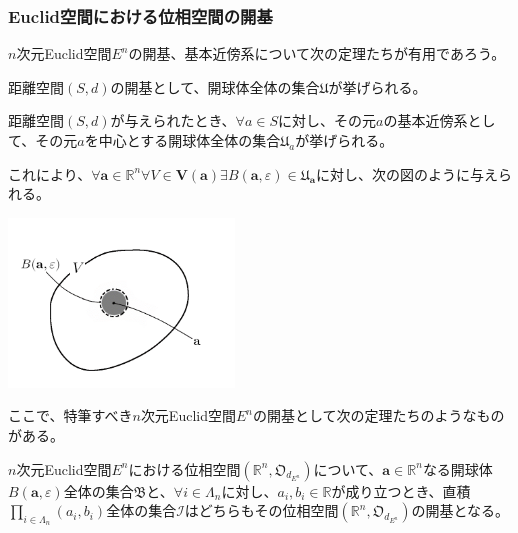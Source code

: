 \documentclass[dvipdfmx]{jsarticle}
\begin{document}
\subsubsection{Euclid空間における位相空間の開基}%
$n$次元Euclid空間$E^{n}$の開基、基本近傍系について次の定理たちが有用であろう。
\begin{thm*}
距離空間$(S,d)$の開基として、開球体全体の集合$\mathfrak{U}$が挙げられる。
\end{thm*}
\begin{thm*}
距離空間$(S,d)$が与えられたとき、$\forall a \in S$に対し、その元$a$の基本近傍系として、その元$a$を中心とする開球体全体の集合$\mathfrak{U}_{a}$が挙げられる。
\end{thm*}\par
これにより、$\forall\mathbf{a} \in \mathbb{R}^{n}\forall V \in \mathbf{V}\left( \mathbf{a} \right)\exists B\left( \mathbf{a},\varepsilon \right) \in \mathfrak{U}_{\mathbf{a}}$に対し、次の図のように与えられる。
\begin{center}
\includegraphics[width=60mm]{8.2.2.a.png}
\end{center}\par
ここで、特筆すべき$n$次元Euclid空間$E^{n}$の開基として次の定理たちのようなものがある。
\begin{thm}\label{8.2.2.3}
$n$次元Euclid空間$E^{n}$における位相空間$\left( \mathbb{R}^{n},\mathfrak{O}_{d_{E^{n}}} \right)$について、$\mathbf{a} \in \mathbb{R}^{n}$なる開球体$B\left( \mathbf{a},\varepsilon \right)$全体の集合$\mathfrak{B}$と、$\forall i \in \varLambda_{n}$に対し、$a_{i},b_{i} \in \mathbb{R}$が成り立つとき、直積$\prod_{i \in \varLambda_{n}} \left( a_{i},b_{i} \right)$全体の集合$\mathcal{I}$はどちらもその位相空間$\left( \mathbb{R}^{n},\mathfrak{O}_{d_{E^{n}}} \right)$の開基となる。
\end{thm}
\end{document}
